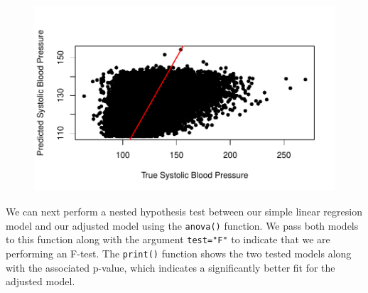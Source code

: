 \documentclass[
  letterpaper,
]{krantz}
\makeatletter
\newenvironment{Shaded}{\begin{snugshade}}{\end{snugshade}}
\newcommand{\AttributeTok}[1]{\textcolor[rgb]{0.40,0.45,0.13}{#1}}
\newcommand{\DecValTok}[1]{\textcolor[rgb]{0.68,0.00,0.00}{#1}}
\newcommand{\FunctionTok}[1]{\textcolor[rgb]{0.28,0.35,0.67}{#1}}
\newcommand{\NormalTok}[1]{\textcolor[rgb]{0.00,0.23,0.31}{#1}}
\newcommand{\SpecialCharTok}[1]{\textcolor[rgb]{0.37,0.37,0.37}{#1}}
\newcommand{\StringTok}[1]{\textcolor[rgb]{0.13,0.47,0.30}{#1}}
\newenvironment{kframe}{%
\medskip{}
\setlength{\fboxsep}{.8em}
 \def\at@end@of@kframe{}%
 \ifinner\ifhmode%
  \def\at@end@of@kframe{\end{minipage}}%
  \begin{minipage}{\columnwidth}%
 \fi\fi%
 \def\FrameCommand##1{\hskip\@totalleftmargin \hskip-\fboxsep
 \colorbox{shadecolor}{##1}\hskip-\fboxsep
     \hskip-\linewidth \hskip-\@totalleftmargin \hskip\columnwidth}%
 \MakeFramed {\advance\hsize-\width
   \@totalleftmargin\z@ \linewidth\hsize
   \@setminipage}}%
 {\par\unskip\endMakeFramed%
 \at@end@of@kframe}
\renewenvironment{Shaded}{\begin{kframe}}{\end{kframe}}
\makeatother
\begin{document}
\begin{Shaded}
\end{Shaded}

\begin{figure}[H]

{\centering \includegraphics[width=1\textwidth,height=\textheight]{book/10_linear_regression_files/figure-pdf/unnamed-chunk-12-1.pdf}

}

\end{figure}

We can next perform a nested hypothesis test between our simple linear
regresion model and our adjusted model using the \texttt{anova()}
function. We pass both models to this function along with the argument
\texttt{test="F"} to indicate that we are performing an F-test. The
\texttt{print()} function shows the two tested models along with the
associated p-value, which indicates a significantly better fit for the
adjusted model.
\end{document}
